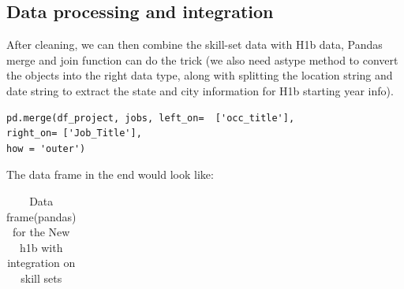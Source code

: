 \subsection{Data processing and integration}
After cleaning, we can then combine the skill-set data with H1b data, Pandas merge and join function can do the trick (we also need astype method to convert the objects into the right data type, along with splitting the location string and date string to extract the state and city information  for H1b starting year info).
\begin{verbatim}
pd.merge(df_project, jobs, left_on=  ['occ_title'],
right_on= ['Job_Title'], 
how = 'outer')
\end{verbatim}
The data frame in the end would look like:
\begin{table}[h!]
	\caption{Data frame(pandas) for the New h1b with integration on skill sets}
	\resizebox{\columnwidth}{3cm}
	{%
\begin{tabular}{llllllllll}
	

\end{tabular}}
\end{table}

